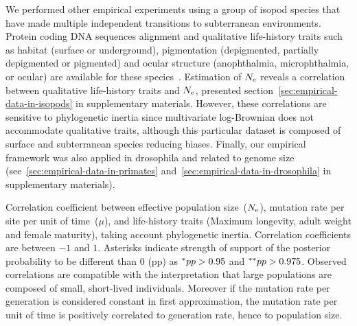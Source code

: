 We performed other empirical experiments using a group of isopod species that have made multiple independent transitions to subterranean environments.
Protein coding DNA sequences alignment and qualitative life-history traits such as habitat (surface or underground), pigmentation (depigmented, partially depigmented or pigmented) and ocular structure (anophthalmia, microphthalmia, or ocular) are available for these species~\citep{Saclier2018}.
Estimation of $N_{\mathrm{e}}$ reveals a correlation between qualitative life-history traits and $N_{\mathrm{e}}$, presented section~\ref{sec:empirical-data-in-isopods} in supplementary materials.
However, these correlations are sensitive to phylogenetic inertia since multivariate log-Brownian does not accommodate qualitative traits, although this particular dataset is composed of surface and subterranean species reducing biases.
Finally, our empirical framework was also applied in drosophila and related to genome size  (see~\ref{sec:empirical-data-in-primates} and~\ref{sec:empirical-data-in-drosophila} in supplementary materials).

\begin{table}[htbp]
    
    \caption[Traits correlation]{
    Correlation coefficient between effective population size~($N_{\mathrm{e}}$), mutation rate per site per unit of time~($\mu$), and life-history traits (Maximum longevity, adult weight and female maturity), taking account phylogenetic inertia.
    Correlation coefficients are between $-1$ and $1$.
    Asterisks indicate strength of support of the posterior probability to be different than $0$ (pp) as $\smash{^{*}} pp > 0.95$ and $\smash{^{**}} pp > 0.975$.
    Observed correlations are compatible with the interpretation that large populations are composed of small, short-lived individuals.
    Moreover if the mutation rate per generation is considered constant in first approximation, the mutation rate per unit of time is positively correlated to generation rate, hence to population size.
    }
    \label{fig:mammals_correlation}
\end{table}


